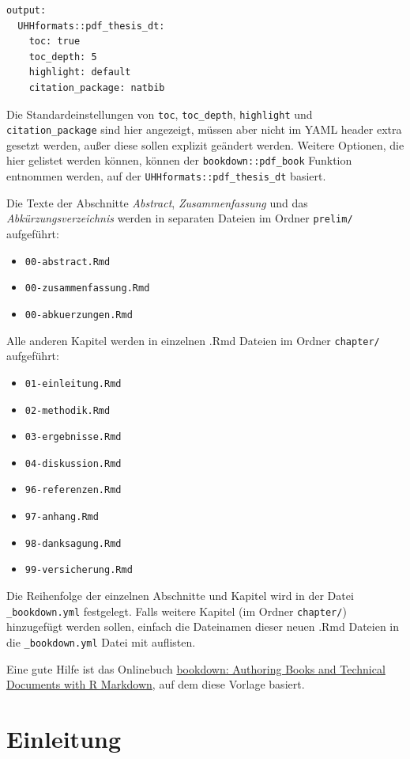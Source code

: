 \documentclass[a4paper,12pt]{article}
\providecommand{\tightlist}{%
  \setlength{\itemsep}{0pt}\setlength{\parskip}{0pt}}
\begin{document}
\begin{verbatim}
output:
  UHHformats::pdf_thesis_dt:
    toc: true
    toc_depth: 5
    highlight: default
    citation_package: natbib
\end{verbatim}
Die Standardeinstellungen von \texttt{toc}, \texttt{toc\_depth}, \texttt{highlight} und \texttt{citation\_package} sind hier angezeigt, müssen aber nicht im YAML header extra gesetzt werden, außer diese sollen explizit geändert werden. Weitere Optionen, die hier gelistet werden können, können der \texttt{bookdown::pdf\_book} Funktion entnommen werden, auf der \texttt{UHHformats::pdf\_thesis\_dt} basiert.

Die Texte der Abschnitte \emph{Abstract}, \emph{Zusammenfassung} und das \emph{Abkürzungsverzeichnis} werden in separaten Dateien im Ordner \texttt{prelim/} aufgeführt:
\begin{itemize}
\tightlist
\item
  \texttt{00-abstract.Rmd}
\item
  \texttt{00-zusammenfassung.Rmd}
\item
  \texttt{00-abkuerzungen.Rmd}
\end{itemize}
Alle anderen Kapitel werden in einzelnen .Rmd Dateien im Ordner \texttt{chapter/} aufgeführt:
\begin{itemize}
\tightlist
\item
  \texttt{01-einleitung.Rmd}
\item
  \texttt{02-methodik.Rmd}
\item
  \texttt{03-ergebnisse.Rmd}
\item
  \texttt{04-diskussion.Rmd}
\item
  \texttt{96-referenzen.Rmd}
\item
  \texttt{97-anhang.Rmd}
\item
  \texttt{98-danksagung.Rmd}
\item
  \texttt{99-versicherung.Rmd}
\end{itemize}
Die Reihenfolge der einzelnen Abschnitte und Kapitel wird in der Datei \texttt{\_bookdown.yml} festgelegt. Falls weitere Kapitel (im Ordner \texttt{chapter/}) hinzugefügt werden sollen, einfach die Dateinamen dieser neuen .Rmd Dateien in die \texttt{\_bookdown.yml} Datei mit auflisten.

Eine gute Hilfe ist das Onlinebuch \href{https://bookdown.org/yihui/bookdown/}{bookdown: Authoring Books and Technical Documents with R Markdown}, auf dem diese Vorlage basiert.

\hypertarget{einleitung}{%
\section{Einleitung}\label{einleitung}}
\end{document}

